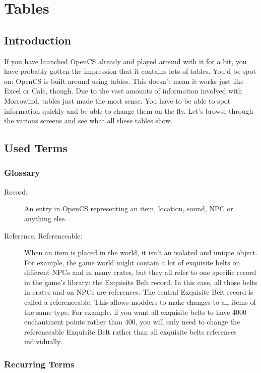 \section{Tables}

\subsection{Introduction}
If you have launched OpenCS already and played around with it for a bit, you have probably gotten the impression that it contains lots of tables. You'd be spot on: OpenCS is built around using tables. This doesn't mean it works just like Excel or Calc, though. Due to the vast amounts of information involved with Morrowind, tables just made the most sense. You have to be able to spot information quickly and be able to change them on the fly. Let's browse through the various screens and see what all these tables show.

\subsection{Used Terms}

\subsubsection{Glossary}

\begin{description}
 \item[Record:] An entry in OpenCS representing an item, location, sound, NPC or anything else.

 \item[Reference, Referenceable:] When an item is placed in the world, it isn't an isolated and unique object. For example, the game world might contain a lot of exquisite belts on different NPCs and in many crates, but they all refer to one specific record in the game's library: the Exquisite Belt record. In this case, all those belts in crates and on NPCs are references. The central Exquisite Belt record is called a referenceable. This allows modders to make changes to all items of the same type. For example, if you want all exquisite belts to have 4000 enchantment points rather than 400, you will only need to change the referenceable Exquisite Belt rather than all exquisite belts references individually.
\end{description}

\subsubsection{Recurring Terms}

